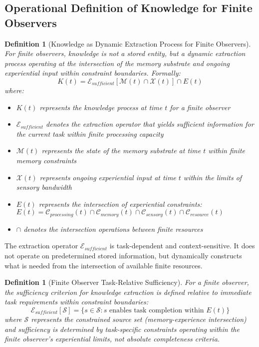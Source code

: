 \documentclass{article}
\newtheorem{definition}[theorem]{Definition}
\begin{document}
\subsection{Operational Definition of Knowledge for Finite Observers}

\begin{definition}[Knowledge as Dynamic Extraction Process for Finite Observers]
For finite observers, knowledge is not a stored entity, but a dynamic extraction process operating at the intersection of the memory substrate and ongoing experiential input within constraint boundaries. Formally:
\begin{equation}
K(t) = \mathcal{E}_{sufficient}[\mathcal{M}(t) \cap \mathcal{X}(t)] \cap E(t)
\end{equation}
where:
\begin{itemize}
\item $K(t)$ represents the knowledge process at time $t$ for a finite observer
\item $\mathcal{E}_{sufficient}$ denotes the extraction operator that yields sufficient information for the current task within finite processing capacity
\item $\mathcal{M}(t)$ represents the state of the memory substrate at time $t$ within finite memory constraints
\item $\mathcal{X}(t)$ represents ongoing experiential input at time $t$ within the limits of sensory bandwidth
\item $E(t)$ represents the intersection of experiential constraints: $E(t) = \mathcal{C}_{processing}(t) \cap \mathcal{C}_{memory}(t) \cap \mathcal{C}_{sensory}(t) \cap \mathcal{C}_{resource}(t)$
\item $\cap$ denotes the intersection operations between finite resources
\end{itemize}
\end{definition}

The extraction operator $\mathcal{E}_{sufficient}$ is task-dependent and context-sensitive. It does not operate on predetermined stored information, but dynamically constructs what is needed from the intersection of available finite resources.

\begin{definition}[Finite Observer Task-Relative Sufficiency]
For a finite observer, the sufficiency criterion for knowledge extraction is defined relative to immediate task requirements within constraint boundaries:
\begin{equation}
\mathcal{E}_{sufficient}[\mathcal{S}] = \{s \in \mathcal{S} : s \text{ enables task completion within } E(t)\}
\end{equation}
where $\mathcal{S}$ represents the constrained source set (memory-experience intersection) and sufficiency is determined by task-specific constraints operating within the finite observer's experiential limits, not absolute completeness criteria.
\end{definition}
\end{document}
